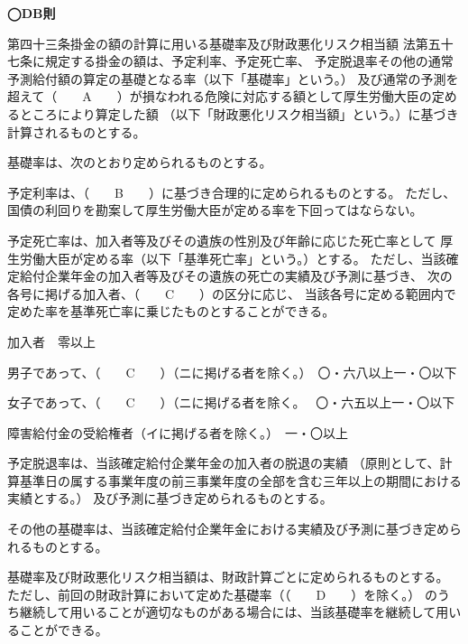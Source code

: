 \begin{fillblank}[数理人試験 2025 問題1 設問2 A〜D]
  \noindent \textbf{◯DB則}
  \begin{lawstructure}
    \begin{lawarticle}{第四十三条}{掛金の額の計算に用いる基礎率及び財政悪化リスク相当額}
      法第五十七条に規定する掛金の額は、予定利率、予定死亡率、
      予定脱退率その他の通常予測給付額の算定の基礎となる率（以下「基礎率」という。）
      及び通常の予測を超えて（　　A　　）が損なわれる危険に対応する額として厚生労働大臣の定めるところにより算定した額
      （以下「財政悪化リスク相当額」という。）に基づき計算されるものとする。

      基礎率は、次のとおり定められるものとする。

予定利率は、（　　B　　）に基づき合理的に定められるものとする。
ただし、国債の利回りを勘案して厚生労働大臣が定める率を下回ってはならない。

予定死亡率は、加入者等及びその遺族の性別及び年齢に応じた死亡率として
厚生労働大臣が定める率（以下「基準死亡率」という。）とする。
ただし、当該確定給付企業年金の加入者等及びその遺族の死亡の実績及び予測に基づき、
次の各号に掲げる加入者、（　　C　　）の区分に応じ、
当該各号に定める範囲内で定めた率を基準死亡率に乗じたものとすることができる。

加入者　零以上

男子であって、（　　C　　）（ニに掲げる者を除く。）　〇・六八以上一・〇以下

女子であって、（　　C　　）（ニに掲げる者を除く。　 〇・六五以上一・〇以下

障害給付金の受給権者（イに掲げる者を除く。）　一・〇以上

予定脱退率は、当該確定給付企業年金の加入者の脱退の実績
（原則として、計算基準日の属する事業年度の前三事業年度の全部を含む三年以上の期間における実績とする。）
及び予測に基づき定められるものとする。

その他の基礎率は、当該確定給付企業年金における実績及び予測に基づき定められるものとする。

基礎率及び財政悪化リスク相当額は、財政計算ごとに定められるものとする。
ただし、前回の財政計算において定めた基礎率（（　　D　　）を除く。）
のうち継続して用いることが適切なものがある場合には、当該基礎率を継続して用いることができる。

    \end{lawarticle}
  \end{lawstructure}
\end{fillblank}

